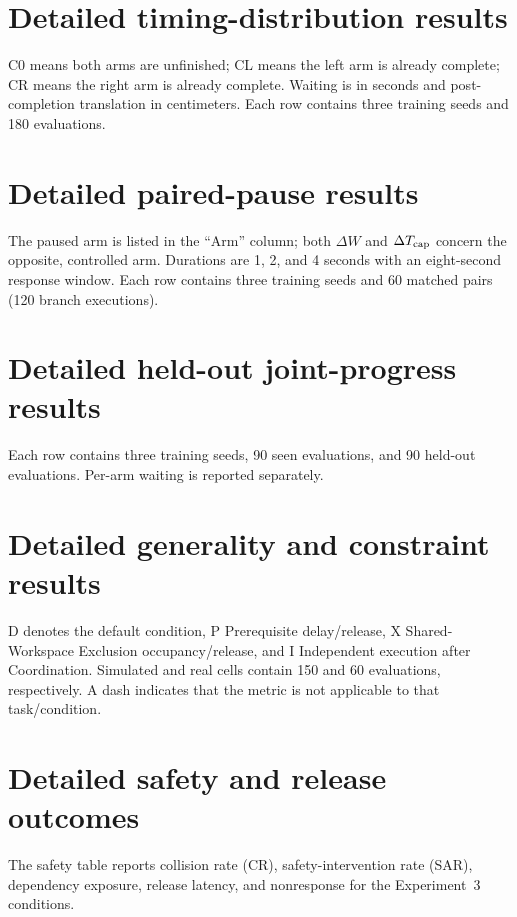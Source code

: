 \clearpage
\section{Detailed timing-distribution results}
\label{app:e1}
C0 means both arms are unfinished; CL means the left arm is already complete; CR means the right arm is already complete. Waiting is in seconds and post-completion translation in centimeters. Each row contains three training seeds and 180 evaluations.
{\setlength{\tabcolsep}{3pt}}

\clearpage
\section{Detailed paired-pause results}
\label{app:e2a}
The paused arm is listed in the ``Arm'' column; both $\Delta W$ and $\Delta T_{\rm cap}$ concern the opposite, controlled arm. Durations are 1, 2, and 4 seconds with an eight-second response window. Each row contains three training seeds and 60 matched pairs (120 branch executions).
{\setlength{\tabcolsep}{3pt}}

\clearpage
\section{Detailed held-out joint-progress results}
\label{app:e2b}
Each row contains three training seeds, 90 seen evaluations, and 90 held-out evaluations. Per-arm waiting is reported separately.
{\setlength{\tabcolsep}{3pt}}

\clearpage
\section{Detailed generality and constraint results}
\label{app:e3}
D denotes the default condition, P Prerequisite delay/release, X Shared-Workspace Exclusion occupancy/release, and I Independent execution after Coordination. Simulated and real cells contain 150 and 60 evaluations, respectively. A dash indicates that the metric is not applicable to that task/condition.
{\setlength{\tabcolsep}{3pt}}

\clearpage
\section{Detailed safety and release outcomes}
The safety table reports collision rate (CR), safety-intervention rate (SAR), dependency exposure, release latency, and nonresponse for the Experiment~3 conditions.
{\setlength{\tabcolsep}{3pt}}


